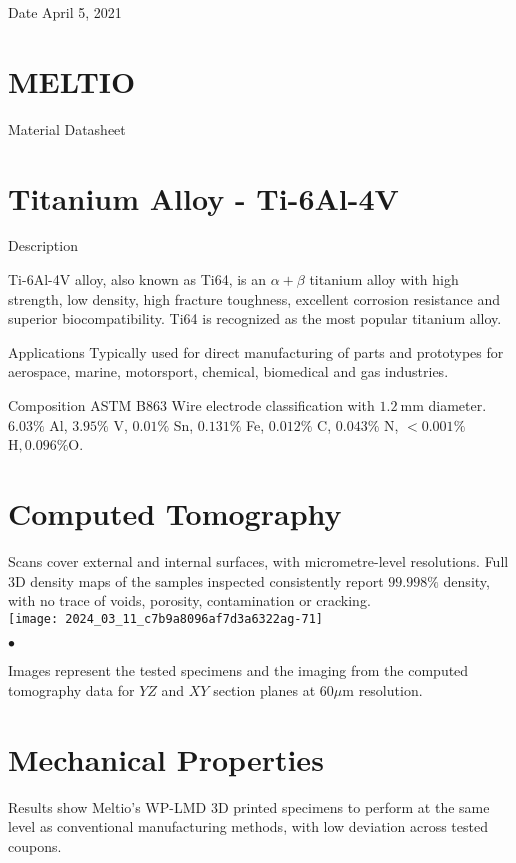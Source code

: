 \documentclass[10pt]{article}
\begin{document}
Date April 5, 2021

\section*{MELTIO}
Material Datasheet

\section*{Titanium Alloy - Ti-6Al-4V}
Description

Ti-6Al-4V alloy, also known as Ti64, is an $\alpha+\beta$ titanium alloy with high strength, low density, high fracture toughness, excellent corrosion resistance and superior biocompatibility. Ti64 is recognized as the most popular titanium alloy.

Applications Typically used for direct manufacturing of parts and prototypes for aerospace, marine, motorsport, chemical, biomedical and gas industries.

Composition ASTM B863 Wire electrode classification with $1.2 \mathrm{~mm}$ diameter. $6.03 \%$ Al, $3.95 \%$ V, $0.01 \%$ Sn, $0.131 \%$ Fe, $0.012 \%$ C, $0.043 \%$ N, $<0.001 \%$ $\mathrm{H}, 0.096 \% \mathrm{O}$.

\section*{Computed Tomography}
Scans cover external and internal surfaces, with micrometre-level resolutions. Full 3D density maps of the samples inspected consistently report $99.998 \%$ density, with no trace of voids, porosity, contamination or cracking.\\
\texttt{[image: 2024\_03\_11\_c7b9a8096af7d3a6322ag-71]}

$\bullet$

Images represent the tested specimens and the imaging from the computed tomography data for $Y Z$ and $X Y$ section planes at $60 \mu \mathrm{m}$ resolution.

\section*{Mechanical Properties}
Results show Meltio's WP-LMD 3D printed specimens to perform at the same level as conventional manufacturing methods, with low deviation across tested coupons.
\end{document}
